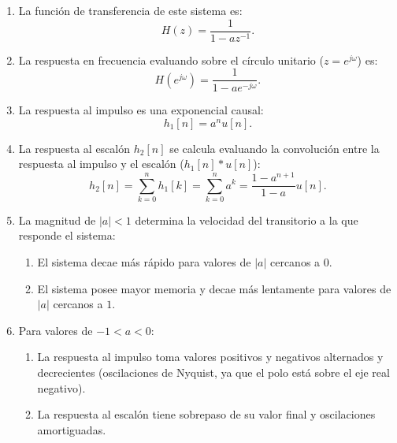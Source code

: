 \begin{enumerate}
	\item La funci\'{o}n de transferencia de este sistema es:
	\begin{equation}
		H(z) = \frac{1}{1 - a z^{-1}}.
	\end{equation}
	
	\item La respuesta en frecuencia evaluando sobre el círculo unitario ($z = e^{j\omega}$) es:
	\begin{equation}
		H(e^{j\omega}) = \frac{1}{1 - a e^{-j\omega}}.
	\end{equation}
	
	\item La respuesta al impulso es una exponencial causal:
	\begin{equation}
		h_{1}[n] = a^{n} u[n].
	\end{equation}
	
	\item La respuesta al escal\'{o}n $h_{2}[n]$ se calcula evaluando la convoluci\'{o}n entre la respuesta al impulso y el escalón ($h_{1}[n] * u[n]$):
	\begin{equation}
		h_{2}[n] = \sum_{k=0}^{n} h_{1}[k] = \sum_{k=0}^{n} a^k = \frac{1 - a^{n+1}}{1 - a} u[n].
	\end{equation}
	
	\item La magnitud de $|a| < 1$ determina la velocidad del transitorio a la que responde el sistema:
	\begin{enumerate}
		\item El sistema decae m\'{a}s r\'{a}pido para valores de $|a|$ cercanos a $0$.
		\item El sistema posee mayor memoria y decae m\'{a}s lentamente para valores de $|a|$ cercanos a $1$.
	\end{enumerate}
	
	\item Para valores de $-1 < a < 0$:
	\begin{enumerate}
		\item La respuesta al impulso toma valores positivos y negativos alternados y decrecientes (oscilaciones de Nyquist, ya que el polo está sobre el eje real negativo).
		\item La respuesta al escal\'{o}n tiene sobrepaso de su valor final y oscilaciones amortiguadas.
	\end{enumerate}
	

\end{enumerate}

